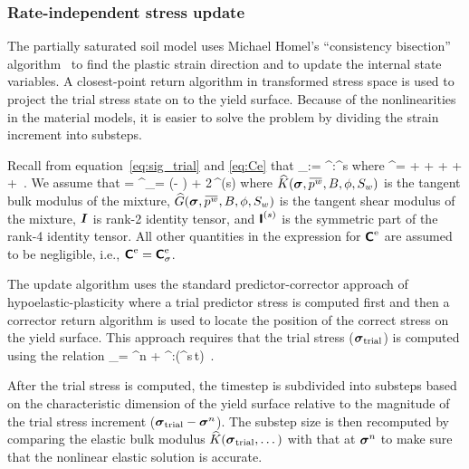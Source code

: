 \documentclass[11pt,a4paper]{article}
\begin{document}
\subsubsection{Rate-independent stress update}
  The partially saturated soil model uses Michael Homel's ``consistency bisection'' 
  algorithm~\citep{Homel2015} 
  to find the plastic strain direction and to update the internal state variables.  A closest-point
  return algorithm in transformed stress space is used to project the trial stress state on to the
  yield surface. Because of the nonlinearities in the material models, it is easier to solve 
  the problem by dividing the strain increment into substeps.

  Recall from equation~\eqref{eq:sig_trial} and \eqref{eq:Ce} that
  \Beq 
    \dot{\Bsig}_\Trial := \SfC^\Te:\BdT^s
  \Eeq
  where
  \Beq 
    \SfC^\Te = 
     \Partial{\Bsig}{\Beps^\Te} + 
      \otimes{} +
      \otimes{} +
      \Partial{\Bsig}{\phi^\Te}\otimes\Partial{\phi^\Te}{\Beps^\Te} +
      \otimes{} +
      \Partial{\Bsig}{\Xbar^\Te}\otimes\Partial{\Xbar^\Te}{\Beps^\Te} \,.
  \Eeq
  We assume that 
  \BBeq
     = \SfC^\Te_\sigma = \left(\Khat -  \Ghat\right) \BI\otimes\BI 
      + 2\Ghat\,\SfI^{(s)}
  \BEeq
  where $\Khat(\Bsig, \bar{p^w}, B, \phi, S_w)$ is the tangent bulk modulus of the mixture, 
  $\Ghat(\Bsig, \bar{p^w}, B, \phi,S_w)$ is the tangent shear modulus of the mixture, 
  $\boldsymbol{I}$ is rank-2 identity tensor, and $\boldsymbol{\mathsf{I}}^{(s)}$ is the symmetric part of the rank-4 identity tensor.
  All other quantities in the expression for $\boldsymbol{\mathsf{C}}^{\text{e}}$ are assumed to be negligible, i.e.,
  $\boldsymbol{\mathsf{C}}^{\text{e}} = \boldsymbol{\mathsf{C}}^{\text{e}}_{\sigma}$.

  The update algorithm uses the standard predictor-corrector approach of hypoelastic-plasticity
  where a trial predictor stress is computed first and then a corrector return algorithm is used to
  locate the position of the correct stress on the yield surface. This approach requires that
  the trial stress ($\boldsymbol{\sigma}_{\text{trial}}$) is computed using the relation
  \Beq
    \Bsig_\Trial = \Bsig^n + \SfC^\Te:(\BdT^s\,\Delta t) \,.
  \Eeq

  After the trial stress is computed, the timestep is subdivided into substeps based on the 
  characteristic dimension of the yield surface relative to the magnitude of the trial stress 
  increment ($\boldsymbol{\sigma}_{\text{trial}} - \boldsymbol{\sigma}^n$).  The substep size is then recomputed by comparing the
  elastic bulk modulus $\widehat{K}(\boldsymbol{\sigma}_{\text{trial}}, \dots)$ with that at $\boldsymbol{\sigma}^n$ to make sure that the 
  nonlinear elastic solution is accurate.
\end{document}
